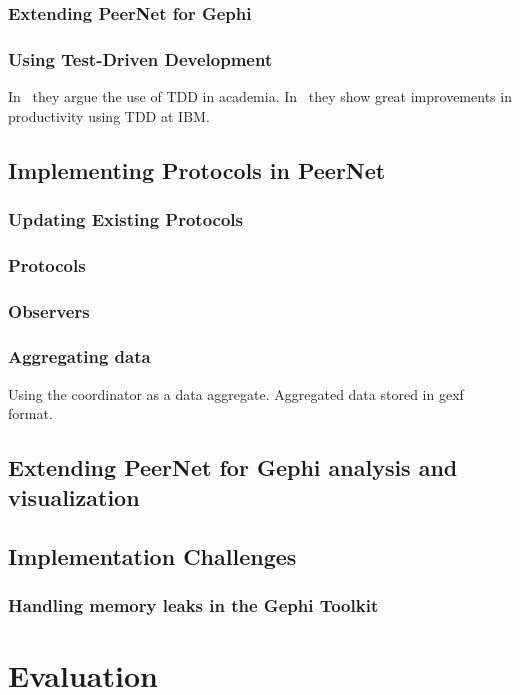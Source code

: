 \documentclass[UKenglish, a4paper]{ifimaster}
\begin{document}
        \subsection{Extending PeerNet for Gephi}
        \subsection{Using Test-Driven Development}
        In~\cite{janzen2005test} they argue the use of TDD in academia.
        In~\cite{maximilien2003assessing} they show great improvements
        in productivity using TDD at IBM.\
    \section{Implementing Protocols in PeerNet}
        \subsection{Updating Existing Protocols}
        \subsection{Protocols}
        \subsection{Observers}
        \subsection{Aggregating data}
            Using the coordinator as a data aggregate. Aggregated data
            stored in gexf format.
    \section{Extending PeerNet for Gephi analysis and visualization}
    \section{Implementation Challenges}
    \subsection{Handling memory leaks in the Gephi Toolkit}

\chapter{Evaluation}
\label{ch:evaluation}
\end{document}
